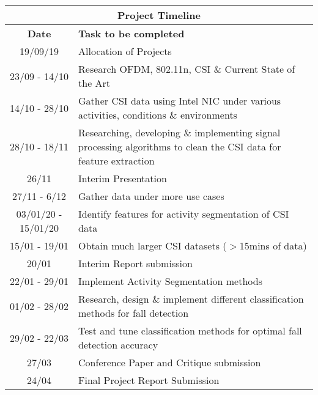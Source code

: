 \begin{center}
\begin{tabular}{|c||p{10cm}|}
 \hline
 \multicolumn{2}{|c|}{\textbf{Project Timeline}} \\
 \hline
 \bfseries Date & \bfseries Task to be completed \\
 \hline
 19/09/19   & Allocation of Projects \\
 23/09 - 14/10 & Research OFDM, 802.11n, CSI \& Current State of the Art \\
 14/10 - 28/10 & Gather CSI data using Intel NIC under various activities, conditions \& environments \\ 
 28/10 - 18/11 & Researching, developing \& implementing signal processing algorithms to clean the CSI data for feature extraction \\
 26/11 & Interim Presentation \\
 27/11 - 6/12 & Gather data under more use cases \\
 03/01/20 - 15/01/20 & Identify features for activity segmentation of CSI data \\
 15/01 - 19/01 & Obtain much larger CSI datasets ($>$15mins of data) \\
 20/01 & Interim Report submission \\
 22/01 - 29/01 & Implement Activity Segmentation methods \\
 01/02 - 28/02 & Research, design \& implement different classification methods for fall detection \\
 29/02 - 22/03 & Test and tune classification methods for optimal fall detection accuracy \\
 27/03 & Conference Paper and Critique submission \\
 24/04 & Final Project Report Submission \\
 \hline
\end{tabular}
\end{center}
